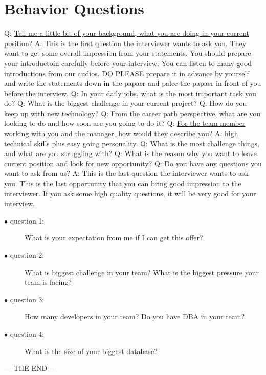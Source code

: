 \documentclass[a4paper,11pt]{article}
\begin{document}
\section{Behavior Questions}
Q: \ul{Tell me a little bit of your background, what you are doing in your current position}? \newline
A: This is the first question the interviewer wants to ask you. They want to get some overall impression from your statements. You should prepare your introductoin carefully before your interview. You can listen to many good introductions from our audios. DO PLEASE prepare it in advance by yourself and write the statements down in the papaer and palce the papaer in front of you before the interview.\newline \newline
\noindent 
Q: In your daily jobs, what is the most important task you do? \newline \newline
\noindent 
Q: What is the biggest challenge in your current project? \newline \newline
\noindent 
Q: How do you keep up with new technology? \newline \newline
\noindent 
Q: From the career path perspective, what are you looking to do and how soon are you going to do it? \newline \newline
\noindent 
Q: \ul{For the team member working with you and the manager, how would they describe you}? \newline 
A: high technical skills plus easy going personality. \newline\newline
\noindent 
Q: What is the most challenge things, and what are you struggling with? \newline \newline
\noindent 
Q: What is the reason why you want to leave current position and look for new opportunity? \newline \newline
\noindent 
Q: \ul{Do you have any questions you want to ask from us}?\newline
A: This is the last question the interviewer wants to ask you. This is the last opportunity that you can bring good impression to the interviewer. If you ask some high quality questions, it will be very good for your interview.
\begin{description}
  \item[$\bullet$ question 1:] What is your expectation from me if I can get this offer?
  \item[$\bullet$ question 2:] What is biggest challenge in your team? What is the biggest pressure your team is facing?
  \item[$\bullet$ question 3:] How many developers in your team? Do you have DBA in your team?
  \item[$\bullet$ question 4:] What is the size of your biggest database?
\end{description}

\noindent 
--- THE END --- 
\end{document}
